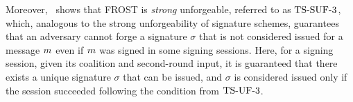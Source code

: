 Moreover,~\cite{BellareCKMTZ22} shows that FROST is \emph{strong} unforgeable, referred to as $\mathrm{TS}\mbox{-}\mathrm{SUF}\mbox{-}{3}$, which, analogous to the strong unforgeability of signature schemes, guarantees that an adversary cannot forge a signature $\sigma$ that is not considered issued for a message $m$ even if $m$ was signed in some signing sessions. Here, for a signing session, given its coalition and second-round input, it is guaranteed that there exists a unique signature $\sigma$ that can be issued, and $\sigma$ is considered issued only if the session succeeded following the condition from $\mathrm{TS}\mbox{-}\mathrm{UF}\mbox{-}{3}$.



